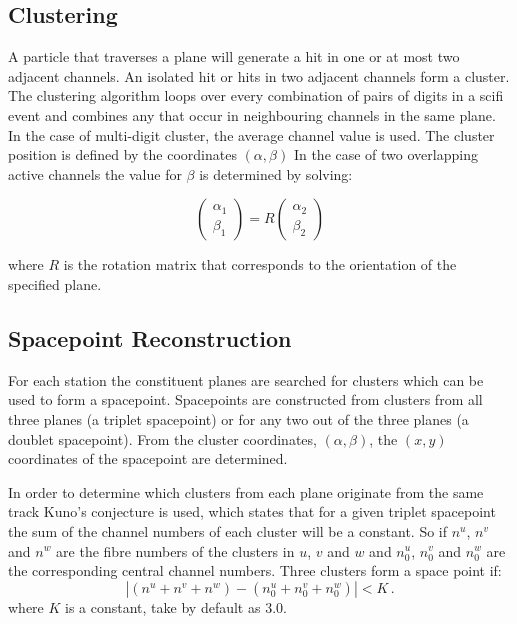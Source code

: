   \subsection{Clustering}
  \label{subsec:Clustering}
  A particle that traverses a plane will generate a hit in one or at most two adjacent channels.  An isolated hit or hits in two adjacent channels form a cluster. The clustering algorithm loops over every combination of pairs of digits in a scifi event and combines any that occur in neighbouring channels in the same plane. In the case of multi-digit cluster, the average channel value is used. The cluster position is defined by the coordinates $(\alpha, \beta)$ %
  In the case of two overlapping active channels the value for $\beta$ is determined by solving:
  
  \begin{equation}
    \begin{pmatrix}
     \alpha_1 \\ \beta_1
    \end{pmatrix} = R
    \begin{pmatrix}
      \alpha_2 \\ \beta_2
    \end{pmatrix}
  \end{equation}
  
  \noindent
  where $R$ is the rotation matrix that corresponds to the orientation of the specified plane. 

  \subsection{Spacepoint Reconstruction}
  \label{subsec:SpacepointReconstruction}
  For each station the constituent planes are searched for clusters which can be used to form a spacepoint. Spacepoints are constructed from clusters from all three planes (a triplet spacepoint) or for any two out of the three planes (a doublet spacepoint). From the cluster coordinates, $(\alpha, \beta)$, the $(x, y)$ coordinates of the spacepoint are determined.

  In order to determine which clusters from each plane originate from the same track Kuno's conjecture\cite{MiceTrackers} is used, which states that for a given triplet spacepoint the sum of the channel numbers of each cluster will be a constant.  So if $n^u$, $n^v$ and $n^w$ are the fibre numbers of the clusters in $u$, $v$ and $w$ and $n^u_0$, $n^v_0$ and $n^w_0$ are the corresponding central channel numbers. Three clusters form a space point if:
  \begin{equation}
    | (n^u + n^v + n^w) - (n^u_0 + n^v_0 + n^w_0) | < K \, .
  \end{equation}
  where $K$ is a constant, take by default as 3.0.
  
